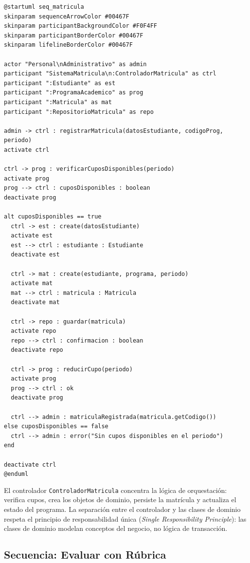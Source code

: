 \begin{lstlisting}[style=plantumlStyle,
  caption={Diagrama de secuencia: matricular estudiante (PlantUML).},
  label={lst:plantuml-seq-matricula}]
@startuml seq_matricula
skinparam sequenceArrowColor #00467F
skinparam participantBackgroundColor #F0F4FF
skinparam participantBorderColor #00467F
skinparam lifelineBorderColor #00467F

actor "Personal\nAdministrativo" as admin
participant "SistemaMatricula\n:ControladorMatricula" as ctrl
participant ":Estudiante" as est
participant ":ProgramaAcademico" as prog
participant ":Matricula" as mat
participant ":RepositorioMatricula" as repo

admin -> ctrl : registrarMatricula(datosEstudiante, codigoProg, periodo)
activate ctrl

ctrl -> prog : verificarCuposDisponibles(periodo)
activate prog
prog --> ctrl : cuposDisponibles : boolean
deactivate prog

alt cuposDisponibles == true
  ctrl -> est : create(datosEstudiante)
  activate est
  est --> ctrl : estudiante : Estudiante
  deactivate est

  ctrl -> mat : create(estudiante, programa, periodo)
  activate mat
  mat --> ctrl : matricula : Matricula
  deactivate mat

  ctrl -> repo : guardar(matricula)
  activate repo
  repo --> ctrl : confirmacion : boolean
  deactivate repo

  ctrl -> prog : reducirCupo(periodo)
  activate prog
  prog --> ctrl : ok
  deactivate prog

  ctrl --> admin : matriculaRegistrada(matricula.getCodigo())
else cuposDisponibles == false
  ctrl --> admin : error("Sin cupos disponibles en el periodo")
end

deactivate ctrl
@enduml
\end{lstlisting}

El controlador \texttt{ControladorMatricula} concentra la lógica de
orquestación: verifica cupos, crea los objetos de dominio, persiste la
matrícula y actualiza el estado del programa. La separación entre el
controlador y las clases de dominio respeta el principio de responsabilidad
única (\textit{Single Responsibility Principle}): las clases de dominio
modelan conceptos del negocio, no lógica de transacción.

\subsection*{Secuencia: Evaluar con Rúbrica}

